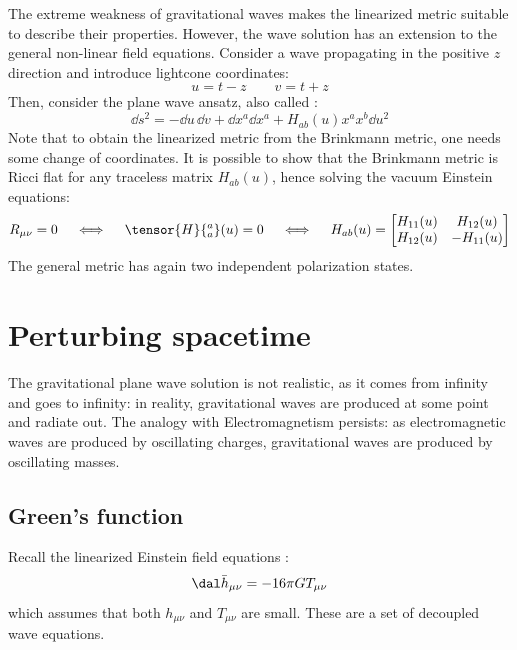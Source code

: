 The extreme weakness of gravitational waves makes the linearized metric  suitable to describe their properties. However, the wave solution has an extension to the general non-linear field equations. Consider a wave propagating in the positive $ z $ direction and introduce lightcone coordinates:
\begin{equation*}
  u = t - z
  \qquad
  v = t + z
\end{equation*}
Then, consider the plane wave ansatz, also called :
\begin{equation*}
  \dd s^2 = -\dd u\,\dd v + \dd x^a \dd x^a + H_{ab}(u) x^a x^b \dd u^2
\end{equation*}
Note that to obtain the linearized metric  from the Brinkmann metric, one needs some change of coordinates. It is possible to show that the Brinkmann metric is Ricci flat for any traceless matrix $ H_{ab}(u) $, hence solving the vacuum Einstein equations:
\begin{equation*}
  R_{\mu \nu} = 0
  \quad \iff \quad
  \tensor{H}{^a_a}(u) = 0
  \quad \iff \quad
  H_{ab}(u) =
  \begin{bmatrix}
    H_{11}(u) & H_{12}(u) \\
    H_{12}(u) & -H_{11}(u)
  \end{bmatrix}
\end{equation*}
The general metric has again two independent polarization states.

\newpage
\section{Perturbing spacetime}

The gravitational plane wave solution  is not realistic, as it comes from infinity and goes to infinity: in reality, gravitational waves are produced at some point and radiate out. The analogy with Electromagnetism persists: as electromagnetic waves are produced by oscillating charges, gravitational waves are produced by oscillating masses.

\subsection{Green's function}

Recall the linearized Einstein field equations :
\begin{equation*}
  \dal \bar{h}_{\mu \nu} = -16\pi G T_{\mu \nu}
\end{equation*}
which assumes that both $ h_{\mu \nu} $ and $ T_{\mu \nu} $ are small. These are a set of decoupled wave equations.

